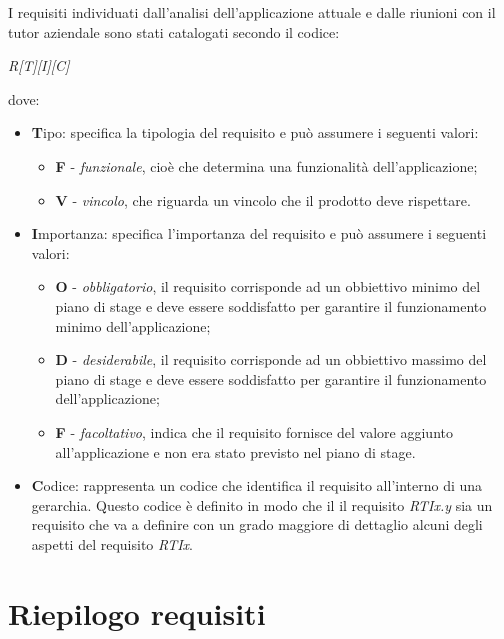 I requisiti individuati dall'analisi dell'applicazione attuale e dalle riunioni con il tutor aziendale sono stati catalogati secondo il codice:
\begin{center}
\textit{R[T][I][C]}
\end{center}
dove:
\begin{itemize}
\item \textbf{T}ipo: specifica la tipologia del requisito e può assumere i seguenti valori:
	\begin{itemize}
	\item \textbf{F} - \textit{funzionale}, cioè che determina una funzionalità dell'applicazione;
	\item \textbf{V} - \textit{vincolo}, che riguarda un vincolo che il prodotto deve rispettare.
	\end{itemize}
\item \textbf{I}mportanza: specifica l'importanza del requisito e può assumere i seguenti valori:
	\begin{itemize}
	\item \textbf{O} - \textit{obbligatorio}, il requisito corrisponde ad un obbiettivo minimo del piano di stage e deve essere soddisfatto per garantire il funzionamento minimo dell'applicazione;
	\item \textbf{D} - \textit{desiderabile}, il requisito corrisponde ad un obbiettivo massimo del piano di stage e deve essere soddisfatto per garantire il funzionamento dell'applicazione;
	\item \textbf{F} - \textit{facoltativo}, indica che il requisito fornisce del valore aggiunto all'applicazione e non era stato previsto nel piano di stage.
	\end{itemize}
\item \textbf{C}odice: rappresenta un codice che identifica il requisito all'interno di una gerarchia. Questo codice è definito in modo che il il requisito \textit{RTIx.y} sia un requisito che va a definire con un grado maggiore di dettaglio alcuni degli aspetti del requisito \textit{RTIx}.
\end{itemize}




\section{Riepilogo requisiti}

